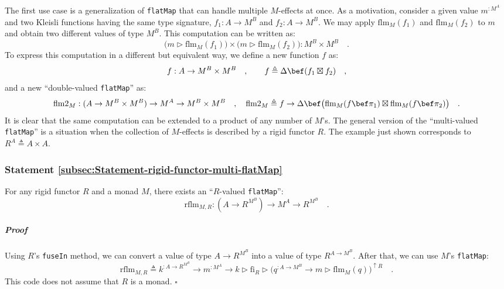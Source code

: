 The first use case is a generalization of \lstinline!flatMap! that
can handle multiple $M$-effects at once. As a motivation, consider
a given value $m^{:M^{A}}$ and two Kleisli functions having the same
type signature, $f_{1}:A\rightarrow M^{B}$ and $f_{2}:A\rightarrow M^{B}$.
We may apply $\text{flm}_{M}(f_{1})$ and $\text{flm}_{M}(f_{2})$
to $m$ and obtain two different values of type $M^{B}$. This computation
can be written as:
\[
\big(m\triangleright\text{flm}_{M}(f_{1})\big)\times\big(m\triangleright\text{flm}_{M}(f_{2})\big):M^{B}\times M^{B}\quad.
\]
To express this computation in a different but equivalent way, we
define a new function $f$ as:
\[
f:A\rightarrow M^{B}\times M^{B}\quad,\quad\quad f\triangleq\Delta\bef(f_{1}\boxtimes f_{2})\quad,
\]
and a new \textsf{``}double-valued \lstinline!flatMap!\textsf{''} as:
\[
\text{flm2}_{M}:(A\rightarrow M^{B}\times M^{B})\rightarrow M^{A}\rightarrow M^{B}\times M^{B}\quad,\quad\text{flm2}_{M}\triangleq f\rightarrow\Delta\bef\big(\text{flm}_{M}(f\bef\pi_{1})\boxtimes\text{flm}_{M}(f\bef\pi_{2})\big)\quad.
\]
It is clear that the same computation can be extended to a product
of any number of $M$\textsf{'}s. The general version of the \textsf{``}multi-valued
\lstinline!flatMap!\textsf{''} is a situation when the collection of $M$-effects
is described by a rigid functor $R$. The example just shown corresponds
to $R^{A}\triangleq A\times A$.

\subsubsection{Statement \label{subsec:Statement-rigid-functor-multi-flatMap}\ref{subsec:Statement-rigid-functor-multi-flatMap}}

For any rigid functor $R$ and a monad $M$, there exists an \textsf{``}$R$-valued
\lstinline!flatMap!\textsf{''}:
\[
\text{rflm}_{M,R}:(A\rightarrow R^{M^{B}})\rightarrow M^{A}\rightarrow R^{M^{B}}\quad.
\]


\subparagraph{Proof}

Using $R$\textsf{'}s \lstinline!fuseIn! method, we can convert a value of
type $A\rightarrow R^{M^{B}}$ into a value of type $R^{A\rightarrow M^{B}}$.
After that, we can use $M$\textsf{'}s \lstinline!flatMap!:
\[
\text{rflm}_{M,R}\triangleq k^{:A\rightarrow R^{M^{B}}}\rightarrow m^{:M^{A}}\rightarrow k\triangleright\text{fi}_{R}\triangleright\big(q^{:A\rightarrow M^{B}}\rightarrow m\triangleright\text{flm}_{M}(q)\big)^{\uparrow R}\quad.
\]
This code does not assume that $R$ is a monad. $\square$

